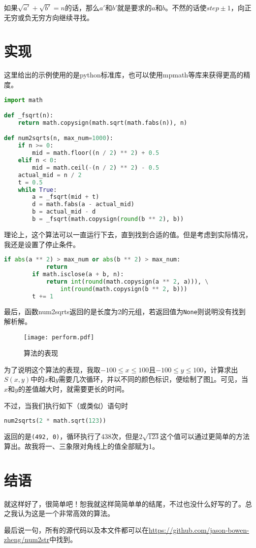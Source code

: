 \documentclass[a4paper, UTF8]{ctexart}
\begin{document}
如果$\sqrt{a'}+\sqrt{b'}=n$的话，那么$a'$和$b'$就是要求的$a$和$b$。不然的话使$step\pm1$，向正无穷或负无穷方向继续寻找。

\section{实现}
这里给出的示例使用的是python标准库，也可以使用mpmath等库来获得更高的精度。
\begin{lstlisting}[language=python, name=example]
import math

def _fsqrt(n):
    return math.copysign(math.sqrt(math.fabs(n)), n)

def num2sqrts(n, max_num=1000):
	if n >= 0:
        mid = math.floor((n / 2) ** 2) + 0.5
    elif n < 0:
        mid = math.ceil(-(n / 2) ** 2) - 0.5
    actual_mid = n / 2
    t = 0.5
    while True:
        a = _fsqrt(mid + t)
        d = math.fabs(a - actual_mid)
        b = actual_mid - d
        b = _fsqrt(math.copysign(round(b ** 2), b))
\end{lstlisting}
理论上，这个算法可以一直运行下去，直到找到合适的值。但是考虑到实际情况，我还是设置了停止条件。
\begin{lstlisting}[language=python, name=example]
        if abs(a ** 2) > max_num or abs(b ** 2) > max_num:
            return
        if math.isclose(a + b, n):
            return int(round(math.copysign(a ** 2, a))), \
                int(round(math.copysign(b ** 2, b)))
        t += 1
\end{lstlisting}
最后，函数num2sqrts返回的是长度为2的元组，若返回值为\verb|None|则说明没有找到解析解。

\begin{figure}[htb]
	\centering
	\texttt{[image: perform.pdf]}
	\caption{算法的表现}
	\label{fig:perform}
\end{figure}

为了说明这个算法的表现，我取$-100\leq x\leq100$且$-100\leq y\leq100$，计算求出$S(x,y)$中的$x$和$y$需要几次循环，并以不同的颜色标识，便绘制了图\ref{fig:perform}。可见，当$x$和$y$的差值越大时，就需要更长的时间。

不过，当我们执行如下（或类似）语句时
\begin{lstlisting}[language=python]
num2sqrts(2 * math.sqrt(123))
\end{lstlisting}
返回的是\verb|(492, 0)|，循环执行了438次，但是$2\sqrt{123}$这个值可以通过更简单的方法算出。故我将一、三象限对角线上的值全部赋为1。

\section{结语}
就这样好了，很简单吧！恕我就这样简简单单的结尾，不过也没什么好写的了。总之我认为这是一个非常高效的算法。

最后说一句，所有的源代码以及本文件都可以在\url{https://github.com/jason-bowen-zheng/num2str}中找到。
\end{document}
